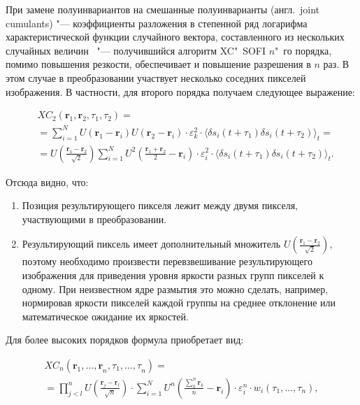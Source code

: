 При замене полуинвариантов на смешанные полуинварианты (англ.~joint cumulants) "--- коэффициенты разложения в степенной ряд логарифма характеристической функции случайного вектора, составленного из нескольких случайных величин~\cite{малахов1978кумулянтный} "--- получившийся алгоритм XC"~SOFI $n$"~го порядка, помимо повышения резкости, обеспечивает и повышение разрешения в $n$ раз. В этом случае в преобразовании участвует несколько соседних пикселей изображения. В частности, для второго порядка получаем следующее выражение:

\begin{align*}
	&{XC}_2\left(\mathbf{r}_1,\mathbf{r}_2,\tau_1,\tau_2\right) = \\
	&= \sum_{i=1}^{N} {U\left(\mathbf{r}_1-\mathbf{r}_i\right)U\left(\mathbf{r}_2-\mathbf{r}_i\right)\cdot\varepsilon_k^2\cdot \langle \delta s_i\left(t+\tau_1\right)\delta s_i\left(t+\tau_2\right) \rangle_t} = \\
	&= U\left(\frac{\mathbf{r}_1-\mathbf{r}_2}{\sqrt2}\right) \sum_{i=1}^{N} {U^2\left(\frac{\mathbf{r}_1+\mathbf{r}_2}{2}-\mathbf{r}_i\right)\cdot\varepsilon_i^2\cdot \langle \delta s_i\left(t+\tau_1\right)\delta s_i\left(t+\tau_2\right) \rangle_t}.
\end{align*}

Отсюда видно, что:
\begin{enumerate}[beginpenalty=10000]
	\item Позиция результирующего пикселя лежит между двумя пикселя, участвующими в преобразовании.
	\item Результирующий пиксель имеет дополнительный множитель $U\left(\frac{\mathbf{r}_1-\mathbf{r}_2}{\sqrt2}\right)$, поэтому необходимо произвести перевзвешивание результирующего изображения для приведения уровня яркости разных групп пикселей к одному. При неизвестном ядре размытия это можно сделать, например, нормировав яркости пикселей каждой группы на среднее отклонение или математическое ожидание их яркостей.
\end{enumerate}

Для более высоких порядков формула приобретает вид:	

\begin{equation*}
	\begin{multlined}
		{XC}_n\left(\mathbf{r}_1,{\ldots,\mathbf{r}}_n,\tau_1,{\ldots,\tau}_n \right) = \\
		= \prod_{j<l}^{n}{U\left(\frac{\mathbf{r}_j-\mathbf{r}_l}{\sqrt n}\right)} \cdot \sum_{i=1}^{N}{U^n\left(\frac{\sum_{k}^{n}\mathbf{r}_k}{n}-\mathbf{r}_i \right)\cdot\varepsilon_i^n\cdot w_i(\tau_1,\ldots,\tau_n)},
	\end{multlined}
\end{equation*}


